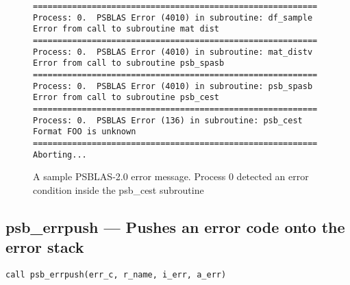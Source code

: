 \begin{figure}[h!]
  \begin{Sbox}
    \begin{minipage}[tl]{0.95\textwidth}
\begin{verbatim}
==========================================================
Process: 0.  PSBLAS Error (4010) in subroutine: df_sample           
Error from call to subroutine mat dist            
==========================================================
Process: 0.  PSBLAS Error (4010) in subroutine: mat_distv           
Error from call to subroutine psb_spasb           
==========================================================
Process: 0.  PSBLAS Error (4010) in subroutine: psb_spasb           
Error from call to subroutine psb_cest            
==========================================================
Process: 0.  PSBLAS Error (136) in subroutine: psb_cest            
Format FOO is unknown
==========================================================
Aborting...
\end{verbatim}
    \end{minipage}
  \end{Sbox}
  \setlength{\fboxsep}{8pt}
  \begin{center}
    \fbox{\TheSbox}
  \end{center}
  \caption{\label{fig:errormsg}A sample PSBLAS-2.0 error
    message. Process 0 detected an error condition inside the {\textrm
    psb\_cest} subroutine}
\end{figure}


\clearpage\subsection*{psb\_errpush --- Pushes an error code onto the error
  stack}

\begin{verbatim}
call psb_errpush(err_c, r_name, i_err, a_err)
\end{verbatim}

